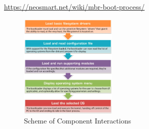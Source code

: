 \url{https://neosmart.net/wiki/mbr-boot-process/}

\begin{figure}[hbt]
  \centerline{\includegraphics[height=5cm,
  angle=0]{./images/GRUB-process.eps}}
  \caption{Scheme of Component Interactions}
  \label{fig:GRUB-process}
\end{figure}

